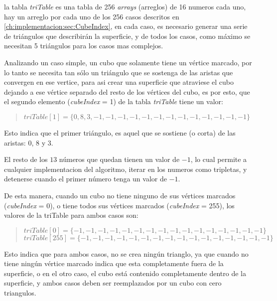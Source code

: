 la tabla \emph{triTable} es una tabla de 256 \emph{arrays} (arreglos) de 16 numeros cada uno, hay un arreglo por cada uno de los 256 casos descritos en \ref{ch:implementacion:sec:CubeIndex}, en cada caso, es necesario generar una serie de triángulos que describirán la superficie, y de todos los casos, como máximo se necesitan 5 triángulos para los casos mas complejos.

Analizando un caso simple, un cubo que solamente tiene un vértice marcado, por lo tanto se necesita tan sólo un triángulo que se sostenga de las aristas que convergen en ese vertice, para asi crear una superficie que atraviese el cubo dejando a ese vértice separado del resto de los vértices del cubo, es por esto, que el segundo elemento (\emph{cubeIndex} = 1) de la tabla \emph{triTable} tiene un valor:

\begin{quote}
	$triTable[1] = \{0, 8, 3, -1, -1, -1, -1, -1, -1, -1, -1, -1, -1, -1, -1, -1\}$
\end{quote}

Esto indica que el primer triángulo, es aquel que se sostiene (o corta) de las aristas: $0$, $8$ y $3$.

El resto de los $13$ números que quedan tienen un valor de $-1$, lo cual permite a cualquier implementacion del algoritmo, iterar en los numeros como tripletas, y detenerse cuando el primer número tenga un valor de $-1$.

De esta manera, cuando un cubo no tiene ninguno de sus vértices marcados (\emph{cubeIndex} = 0), o tiene todos sus vértices marcados (\emph{cubeIndex} = 255), los valores de la triTable para ambos casos son:

\begin{quote}
	$triTable[0]	= \{-1, -1, -1, -1, -1, -1, -1, -1, -1, -1, -1, -1, -1, -1, -1, -1\}$\\
	$triTable[255]	= \{-1, -1, -1, -1, -1, -1, -1, -1, -1, -1, -1, -1, -1, -1, -1, -1\}$
\end{quote}

Esto indica que para ambos casos, no se crea ningún trianglo, ya que cuando no tiene ningún vértice marcado indica que esta completamente fuera de la superficie, o en el otro caso, el cubo está contenido completamente dentro de la superficie, y ambos casos deben ser reemplazados por un cubo con cero triangulos.